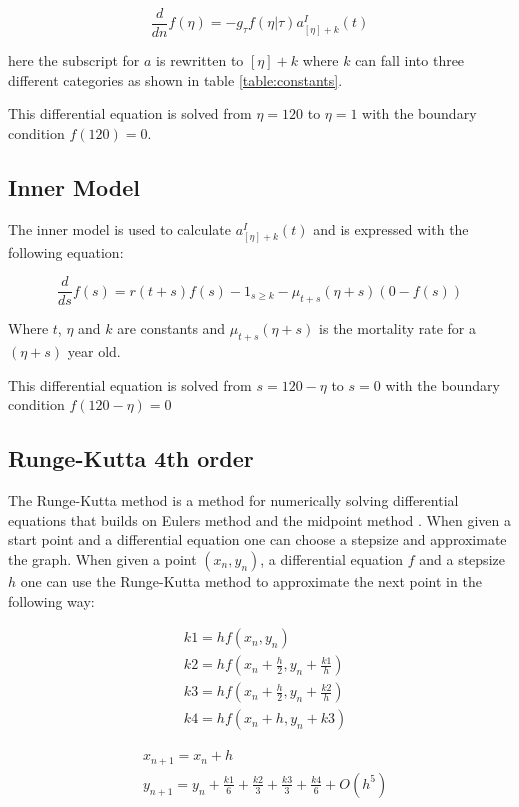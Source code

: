 \begin{equation}
\frac{d}{dn}f(\eta) = -g_\tau f(\eta|\tau)a_{[\eta]+k}^I(t)
\end{equation}

here the subscript for $a$ is rewritten to $[\eta]+k$ where $k$ can fall into three different categories as shown in table \ref{table:constants}. 

This differential equation is solved from $\eta = 120$ to $\eta = 1$ with the boundary condition $f(120) = 0$.

\subsection{Inner Model}
The inner model is used to calculate $a_{[\eta]+k}^I(t)$ and is expressed with the following equation:

\begin{equation}
\frac{d}{ds}f(s) = r(t+s)f(s) - 1_{s \geq k} - \mu_{t+s}(\eta + s)(0 - f(s))
\end{equation}

Where $t$, $\eta$ and $k$ are constants and $\mu_{t+s}(\eta + s)$ is the mortality rate for a $(\eta + s)$ year old.

This differential equation is solved from $s = 120 - \eta$ to $s = 0$ with the boundary condition $f(120 - \eta) = 0$

\subsection{Runge-Kutta 4th order}
The Runge-Kutta method is a method for numerically solving differential equations that builds on Eulers method \cite{nric} and the midpoint method \cite{nric}. When given a start point and a differential equation one can choose a stepsize and approximate the graph.
When given a point $(x_n,y_n)$, a differential equation $f$ and a stepsize $h$ one can use the Runge-Kutta method to approximate the next point in the following way:

\begin{align}
\nonumber &k1 = h f(x_n, y_n) \\
\nonumber &k2 = h f(x_n + \frac{h}{2}, y_n + \frac{k1}{h} ) \\
\nonumber &k3 = h f(x_n + \frac{h}{2}, y_n + \frac{k2}{h} ) \\
&k4 = h f(x_n + h, y_n + k3 )
\end{align} 

\begin{align}
\nonumber& x_{n + 1} = x_n + h \\
&y_{n + 1} = y_n + \frac{k1}{6} + \frac{k2}{3} + \frac{k3}{3} + \frac{k4}{6} + O(h^5)
\end{align}

